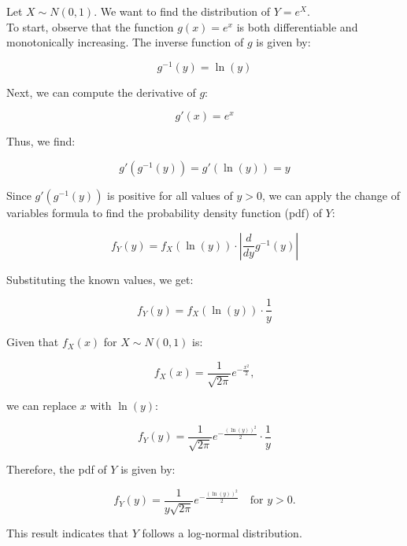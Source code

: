 \begin{example}
Let \( X \sim N(0, 1) \). We want to find the distribution of \( Y = e^X \).\\

To start, observe that the function \( g(x) = e^x \) is both differentiable and monotonically increasing. The inverse function of \( g \) is given by:

\[
g^{-1}(y) = \ln(y)
\]

Next, we can compute the derivative of \( g \):

\[
g'(x) = e^x
\]

Thus, we find:

\[
g'(g^{-1}(y)) = g'(\ln(y)) = y
\]

Since \( g'(g^{-1}(y)) \) is positive for all values of \( y > 0 \), we can apply the change of variables formula to find the probability density function (pdf) of \( Y \):

\[
f_Y(y) = f_X(\ln(y)) \cdot \left| \frac{d}{dy} g^{-1}(y) \right|
\]

Substituting the known values, we get:

\[
f_Y(y) = f_X(\ln(y)) \cdot \frac{1}{y}
\]

Given that \( f_X(x) \) for \( X \sim N(0, 1) \) is:

\[
f_X(x) = \frac{1}{\sqrt{2\pi}} e^{-\frac{x^2}{2}},
\]

we can replace \( x \) with \( \ln(y) \):

\[
f_Y(y) = \frac{1}{\sqrt{2\pi}} e^{-\frac{(\ln(y))^2}{2}} \cdot \frac{1}{y}
\]

Therefore, the pdf of \( Y \) is given by:

\[
f_Y(y) = \frac{1}{y\sqrt{2\pi}} e^{-\frac{(\ln(y))^2}{2}} \quad \text{for } y > 0.
\]

This result indicates that \( Y \) follows a log-normal distribution.
\end{example}


